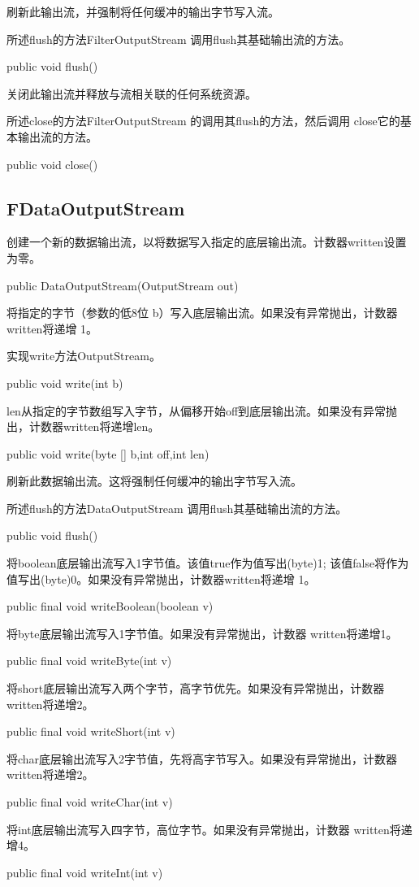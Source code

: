 刷新此输出流，并强制将任何缓冲的输出字节写入流。

所述flush的方法FilterOutputStream 调用flush其基础输出流的方法。
\begin{java}
public void flush()
\end{java}
关闭此输出流并释放与流相关联的任何系统资源。

所述close的方法FilterOutputStream 的调用其flush的方法，然后调用 close它的基本输出流的方法。
\begin{java}
public void close()
\end{java}


\subsection{FDataOutputStream}

创建一个新的数据输出流，以将数据写入指定的底层输出流。计数器written设置为零。

\begin{java}
public DataOutputStream(OutputStream  out)
\end{java}
将指定的字节（参数的低8位 b）写入底层输出流。如果没有异常抛出，计数器written将递增 1。

实现write方法OutputStream。
\begin{java}
public void write(int b)
\end{java}
len从指定的字节数组写入字节，从偏移开始off到底层输出流。如果没有异常抛出，计数器written将递增len。
\begin{java}
public void write(byte [] b,int off,int len)
\end{java}
刷新此数据输出流。这将强制任何缓冲的输出字节写入流。

所述flush的方法DataOutputStream 调用flush其基础输出流的方法。
\begin{java}
public void flush()
\end{java}

将boolean底层输出流写入1字节值。该值true作为值写出(byte)1; 该值false将作为值写出(byte)0。如果没有异常抛出，计数器written将递增 1。
\begin{java}
public final void writeBoolean(boolean v)
\end{java}
将byte底层输出流写入1字节值。如果没有异常抛出，计数器 written将递增1。
\begin{java}
public final void writeByte(int v)
\end{java}

将short底层输出流写入两个字节，高字节优先。如果没有异常抛出，计数器 written将递增2。
\begin{java}
public final void writeShort(int v)
\end{java}
将char底层输出流写入2字节值，先将高字节写入。如果没有异常抛出，计数器written将递增2。
\begin{java}
public final void writeChar(int v)
\end{java}
将int底层输出流写入四字节，高位字节。如果没有异常抛出，计数器 written将递增4。
\begin{java}
public final void writeInt(int v)
\end{java}

